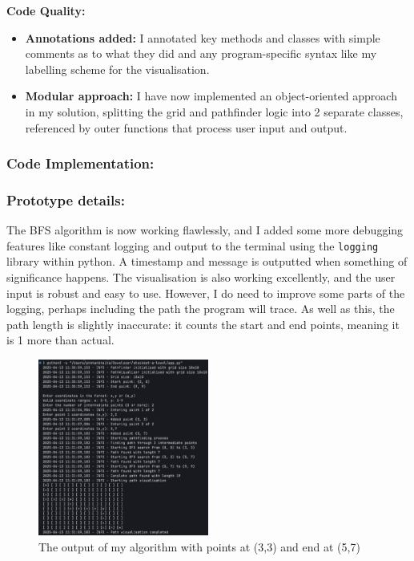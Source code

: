 \textbf{Code Quality:}
\begin{itemize}
    \item \textbf{Annotations added:} I annotated key methods and classes with simple comments as to what they did and any program-specific syntax like my labelling scheme for the visualisation.

    \item \textbf{Modular approach:} I have now implemented an object-oriented approach in my solution, splitting the grid and pathfinder logic into 2 separate classes, referenced by outer functions that process user input and output.
\end{itemize}



\subsubsection{Code Implementation:}



\subsubsection{Prototype details:} 
The BFS algorithm is now working flawlessly, and I added some more debugging features like constant logging and output to the terminal using the \verb|logging| library within python. A timestamp and message is outputted when something of significance happens. The visualisation is also working excellently, and the user input is robust and easy to use. However, I do need to improve some parts of the logging, perhaps including the path the program will trace. As well as this, the path length is slightly inaccurate: it counts the start and end points, meaning it is 1 more than actual.

\begin{figure}[htbp]
    \centering
    \includegraphics[width=0.5\textwidth]{Images/sa2test1.png}
    \caption{The output of my algorithm with points at (3,3) and end at (5,7)}
\end{figure}

